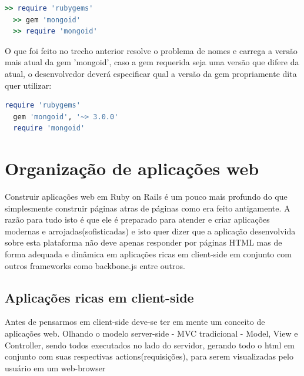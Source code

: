 {\singlespace
\begin{lstlisting}[caption=Exemplo de versionamento de gems,language=Ruby,label={versionamento}]
  >> require 'rubygems'
  >> gem 'mongoid'
  >> require 'mongoid'
\end{lstlisting}
}

O que foi feito no trecho anterior resolve o problema de nomes e carrega a versão mais atual da gem 'mongoid', caso a gem requerida seja 
uma versão que difere da atual, o desenvolvedor deverá especificar qual a versão da gem propriamente dita quer utilizar:


{\singlespace
\begin{lstlisting}[caption=Exemplo de versionamento de gems,language=Ruby,label={versionamento}]
  require 'rubygems'
  gem 'mongoid', '~> 3.0.0'
  require 'mongoid'
\end{lstlisting}
}

\section{Organização de aplicações web}

Construir aplicações web em Ruby on Rails é um pouco mais profundo do que simplesmente construir páginas atras de páginas como era feito antigamente.
A razão para tudo isto é que ele é preparado para atender e criar aplicações modernas e arrojadas(sofisticadas) e isto quer dizer que a aplicação desenvolvida
sobre esta plataforma não deve apenas responder por páginas HTML mas de forma adequada e dinâmica em aplicações ricas em client-side em conjunto com outros 
frameworks como backbone.js entre outros.

\subsection{Aplicações ricas em client-side}
Antes de pensarmos em client-side deve-se ter em mente um conceito de aplicações web. Olhando o modelo server-side - MVC tradicional - Model, View e Controller, 
sendo todos executados no lado do servidor, gerando todo o html em conjunto com suas respectivas actions(requisições), para serem visualizadas pelo usuário em um web-browser

